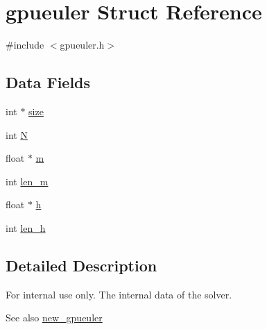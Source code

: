 \hypertarget{structgpueuler}{
\section{gpueuler Struct Reference}
\label{structgpueuler}
}


{\ttfamily \#include $<$gpueuler.h$>$}

\subsection*{Data Fields}
\begin{DoxyCompactItemize}
\item 
int $\ast$ \hyperlink{structgpueuler_a4afe1b2933e72e4c43e42b8e03c8a364}{size}
\item 
int \hyperlink{structgpueuler_a939192bbd3a158f77f9c3fbb4527a0b4}{N}
\item 
float $\ast$ \hyperlink{structgpueuler_ae1c9d0beceddacb821fb9f03e392eb7a}{m}
\item 
int \hyperlink{structgpueuler_a038ca1c07835604fb3de105fcae2ab46}{len\_\-m}
\item 
float $\ast$ \hyperlink{structgpueuler_a498c5070bf962e7189b40e06fb7cab17}{h}
\item 
int \hyperlink{structgpueuler_a404bb123874d77a317934d415b8b2edf}{len\_\-h}
\end{DoxyCompactItemize}


\subsection{Detailed Description}
\begin{DoxyInternal}{For internal use only.}
The internal data of the solver. \begin{DoxySeeAlso}{See also}
\hyperlink{gpueuler_8h_a0f9b1e11bec3448340e8b524b0135ca4}{new\_\-gpueuler} 
\end{DoxySeeAlso}
\end{DoxyInternal}


